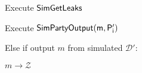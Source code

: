 \begin{bbox}[title={$\mathcal{S}_{pay}(P_s, P_r, b_r, b_s)$}]
\begin{renumerate}
			\quad Execute ${\mathsf {SimGetLeaks}}$

			\quad Execute ${\mathsf {SimPartyOutput(m, P_i')}}$

		\item Else if output $m$ from simulated $\mathcal{D}'$:
			
			\quad \Send $m \rightarrow \mathcal{Z}$
	\end{renumerate}

\end{bbox}
